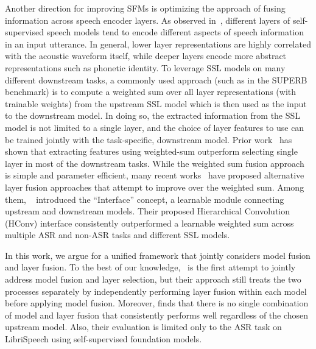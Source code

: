 Another direction for improving SFMs is optimizing the approach of fusing information across speech encoder layers.
As observed in~\cite{Ankita2022CCA}, different layers of self-supervised speech models tend to encode different aspects of speech information in an input utterance. 
In general, lower layer representations are highly correlated with the acoustic waveform itself, while deeper layers encode more abstract representations such as phonetic identity.
To leverage SSL models on many different downstream tasks,
a commonly used approach (such as in the SUPERB~\cite{yang21c_superb} benchmark) is to compute a weighted sum over all layer representations (with trainable weights) from the upstream SSL model which is then used as the input to the downstream model. 
In doing so, the extracted information from the SSL model is not limited to a single layer, and the choice of layer features to use can be trained jointly with the task-specific, downstream model.
Prior work~\cite{yang_sfm_eval} has shown that extracting features using weighted-sum outperform selecting single layer in most of the downstream tasks.
While the weighted sum fusion approach is simple and parameter efficient, many recent works~\cite{huo23b_gaff,chiu24_sinica,shih24_interface} have proposed alternative layer fusion approaches that attempt to improve over the weighted sum.
Among them, ~\cite{shih24_interface} introduced the ``Interface'' concept, a learnable module connecting upstream and downstream models. 
Their proposed Hierarchical Convolution (HConv) interface consistently outperformed a learnable weighted sum across multiple ASR and non-ASR tasks and different SSL models.


% 

In this work, we argue for a unified framework that jointly considers model fusion and layer fusion. 
To the best of our knowledge,~\cite{chiu24_sinica} is the first attempt to jointly address model fusion and layer selection, but their approach still treats the two processes separately by independently performing layer fusion within each model before applying model fusion. 
Moreover, \cite{chiu24_sinica} finds that there is no single combination of model and layer fusion that consistently performs well regardless of the chosen upstream model.
Also, their evaluation is limited only to the ASR task on LibriSpeech using self-supervised foundation models.

